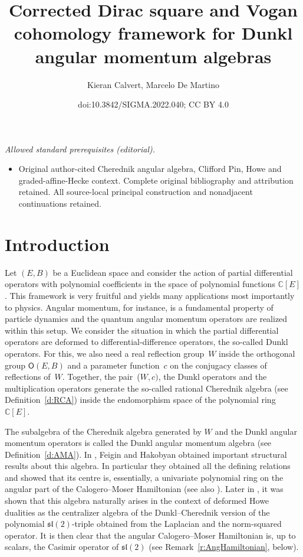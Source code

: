 \documentclass[10pt,a4paper]{amsart}
\title{Corrected Dirac square and Vogan cohomology framework for Dunkl angular momentum algebras}
\author{Kieran Calvert, Marcelo De Martino}
\date{doi:10.3842/SIGMA.2022.040; CC BY 4.0}
\numberwithin{equation}{section}
\newcommand{\bbc}{\mathbb{C}}
\begin{document}
\maketitle
\noindent\textit{Allowed standard prerequisites (editorial).}\begin{itemize}
\item Original author-cited Cherednik angular algebra, Clifford Pin, Howe and graded-affine-Hecke context. Complete original bibliography and attribution retained. All source-local principal construction and nonadjacent continuations retained.
\end{itemize}\medskip
\section{Introduction}
Let $(E,B)$ be a Euclidean space and consider the action of partial differential operators with polynomial coefficients in the space of polynomial functions $\bbc[E]$. This framework is very fruitful and yields many applications most importantly to physics. Angular momentum, for instance, is a fundamental property of particle dynamics and the quantum angular momentum operators are realized within this setup. We consider the situation in which the partial differential operators are deformed to differential-difference operators, the so-called Dunkl operators. For this, we also need a real reflection group~$W$ inside the orthogonal group $\mathsf{O}(E,B)$ and a parameter function~$c$ on the conjugacy classes of reflections of~$W$. Together, the pair~($W,c)$, the Dunkl operators and the multiplication operators generate the so-called rational Cherednik algebra (see Definition~\ref{d:RCA}) inside the endomorphism space of the polynomial ring~$\mathbb{C}[E]$.

The subalgebra of the Cherednik algebra generated by $W$ and the Dunkl angular momentum operators is called the Dunkl angular momentum algebra (see Definition~\ref{d:AMA}). In \cite{FH15}, Feigin and Hakobyan obtained important structural results about this algebra. In particular they obtained all the defining relations and showed that its centre is, essentially, a univariate polynomial ring on the angular part of the Calogero--Moser Hamiltonian (see also \cite[Remark~3.3]{FH19}). Later in \cite{CDM20}, it was shown that this algebra naturally arises in the context of deformed Howe dualities as the centralizer algebra of the Dunkl--Cherednik version of the polynomial $\mathfrak{sl}(2)$-triple obtained from the Laplacian and the norm-squared operator. It is then clear that the angular Calogero--Moser Hamiltonian is, up to scalars, the Casimir operator of $\mathfrak{sl}(2)$ (see Remark~\ref{r:AngHamiltonian}, below).
\end{document}
